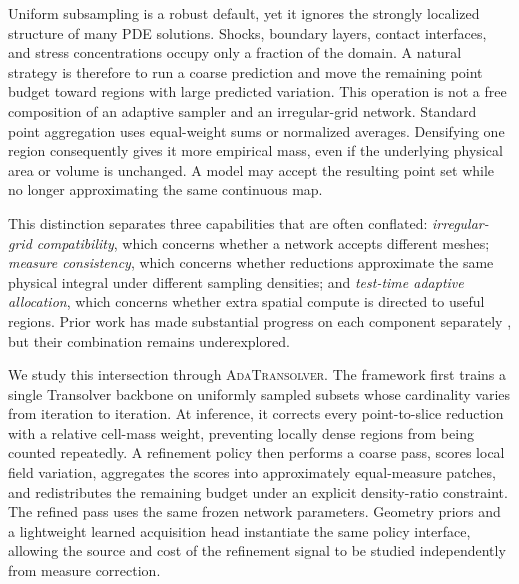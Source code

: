 \documentclass{article}
\newcommand{\method}{\textsc{AdaTransolver}}
\begin{document}
Uniform subsampling is a robust default, yet it ignores the strongly localized
structure of many PDE solutions. Shocks, boundary layers, contact interfaces,
and stress concentrations occupy only a fraction of the domain. A natural
strategy is therefore to run a coarse prediction and move the remaining point
budget toward regions with large predicted variation. This operation is not a
free composition of an adaptive sampler and an irregular-grid network. Standard
point aggregation uses equal-weight sums or normalized averages. Densifying one
region consequently gives it more empirical mass, even if the underlying
physical area or volume is unchanged. A model may accept the resulting point
set while no longer approximating the same continuous map.

This distinction separates three capabilities that are often conflated:
\emph{irregular-grid compatibility}, which concerns whether a network accepts
different meshes; \emph{measure consistency}, which concerns whether reductions
approximate the same physical integral under different sampling densities; and
\emph{test-time adaptive allocation}, which concerns whether extra spatial
compute is directed to useful regions. Prior work has made substantial progress
on each component separately
\citep{liu2023nuno,berner2026functionspaces,doherty2024quadconv,gao2025discretization,
rowbottom2024gadaptivity}, but their combination remains underexplored.

We study this intersection through \method. The framework first trains a single
Transolver backbone on uniformly sampled subsets whose cardinality varies from
iteration to iteration. At inference, it corrects every point-to-slice reduction
with a relative cell-mass weight, preventing locally dense regions from being
counted repeatedly. A refinement policy then performs a coarse pass, scores
local field variation, aggregates the scores into approximately equal-measure
patches, and redistributes the remaining budget under an explicit density-ratio
constraint. The refined pass uses the same frozen network parameters. Geometry
priors and a lightweight learned acquisition head instantiate the same policy
interface, allowing the source and cost of the refinement signal to be studied
independently from measure correction.
\end{document}
